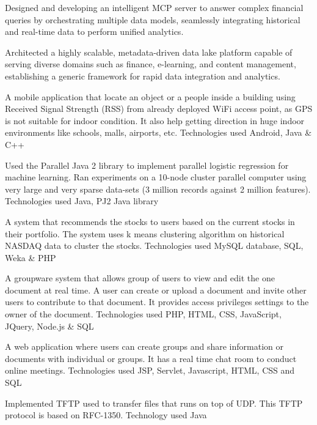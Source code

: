 \documentclass[]{main}
\begin{document}
\begin{minipage}[t]{0.73\textwidth}
  
Designed and developing an intelligent MCP server to answer complex financial queries by orchestrating multiple data models, seamlessly integrating historical and real-time data to perform unified analytics.
\sectionsep

  
Architected a highly scalable, metadata-driven data lake platform capable of serving diverse domains such as finance, e-learning, and content management, establishing a generic framework for rapid data integration and analytics.
\sectionsep

 
A mobile application that locate an object or a people inside a building using Received Signal Strength (RSS) from already deployed WiFi access point, as GPS is not suitable for indoor condition.
It also help getting direction in huge indoor environments like schools, malls, airports, etc.
Technologies used Android, Java \& C++
\sectionsep

 
Used the Parallel Java 2 library to implement parallel logistic regression for machine learning.
Ran experiments on a 10-node cluster parallel computer using very large and very sparse data-sets (3 million records against 2 million features).
Technologies used Java, PJ2 Java library
\sectionsep

 
A system that recommends the stocks to users based on the current stocks in their portfolio. 
The system uses k means clustering algorithm on historical NASDAQ data to cluster the stocks. 
Technologies used MySQL database, SQL, Weka \& PHP
\sectionsep

 
A groupware system that allows group of users to view and edit the one document at real time. 
A user can create or upload a document and invite other users to contribute to that document. 
It provides access privileges settings to the owner of the document.
Technologies used PHP, HTML, CSS, JavaScript, JQuery, Node.js \& SQL
\sectionsep

 
A web application where users can create groups and share information or documents with individual or groups.
It has a real time chat room to conduct online meetings.
Technologies used JSP, Servlet, Javascript, HTML, CSS and SQL
\sectionsep

 
Implemented TFTP used to transfer files that runs on top of UDP. This TFTP protocol is based on RFC-1350.
Technology used Java
\sectionsep

\end{minipage}
\end{document}
